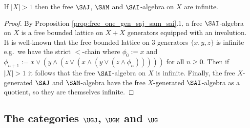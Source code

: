 \documentclass{article}
\begin{document}
\begin{corollary}
If $|X| > 1$ then the free $\SAJ$, $\SAM$ and $\SAI$-algebra on $X$ are infinite.
\end{corollary}

\begin{proof}
By Proposition \ref{prop:free_one_gen_saj_sam_sai}.1, a free $\SAI$-algebra on $X$ is a free bounded lattice on $X + X$ generators equipped with an involution. It is well-known that the free bounded lattice on $3$ generators $\{x,y,z\}$ is infinite e.g.\ we have the strict $<$-chain where $\phi_0 := x$ and $\phi_{n+1} := x \lor (y \land (z \lor (x \land (y \lor (z \land \phi_n)))))$ for all $n \geq 0$. Then if $|X| > 1$ it follows that the free $\SAI$-algebra on $X$ is infinite. Finally, the free $X$-generated $\SAJ$ and $\SAM$-algebra have the free $X$-generated $\SAI$-algebra as a quotient, so they are themselves infinite.
\end{proof}


\subsection{The categories $\UGJ$, $\UGM$ and $\UG$}



\end{document}
